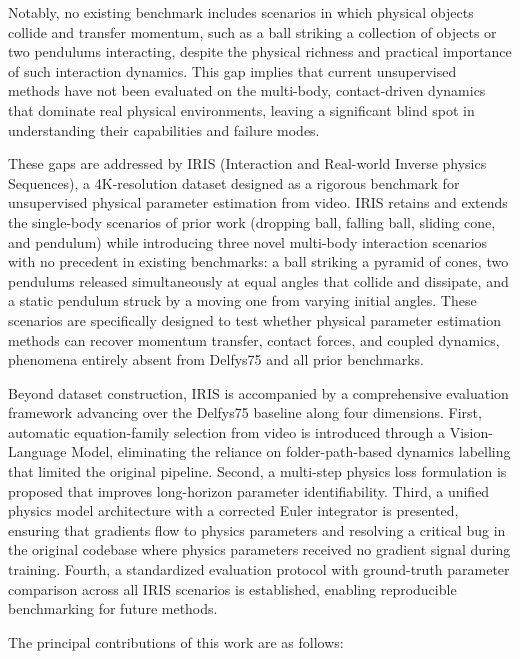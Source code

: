 \documentclass[runningheads]{llncs}
\begin{document}
Notably, no existing benchmark includes scenarios in which physical objects collide and transfer momentum, such as a ball striking a collection of objects or two pendulums interacting, despite the physical richness and practical importance of such interaction dynamics. This gap implies that current unsupervised methods have not been evaluated on the multi-body, contact-driven dynamics that dominate real physical environments, leaving a significant blind spot in understanding their capabilities and failure modes.

These gaps are addressed by IRIS (Interaction and Real-world Inverse physics Sequences), a 4K-resolution dataset designed as a rigorous benchmark for unsupervised physical parameter estimation from video. IRIS retains and extends the single-body scenarios of prior work (dropping ball, falling ball, sliding cone, and pendulum) while introducing three novel multi-body interaction scenarios with no precedent in existing benchmarks: a ball striking a pyramid of cones, two pendulums released simultaneously at equal angles that collide and dissipate, and a static pendulum struck by a moving one from varying initial angles. These scenarios are specifically designed to test whether physical parameter estimation methods can recover momentum transfer, contact forces, and coupled dynamics, phenomena entirely absent from Delfys75 and all prior benchmarks.

Beyond dataset construction, IRIS is accompanied by a comprehensive evaluation framework advancing over the Delfys75 baseline along four dimensions. First, automatic equation-family selection from video is introduced through a Vision-Language Model, eliminating the reliance on folder-path-based dynamics labelling that limited the original pipeline. Second, a multi-step physics loss formulation is proposed that improves long-horizon parameter identifiability. Third, a unified physics model architecture with a corrected Euler integrator is presented, ensuring that gradients flow to physics parameters and resolving a critical bug in the original codebase where physics parameters received no gradient signal during training. Fourth, a standardized evaluation protocol with ground-truth parameter comparison across all IRIS scenarios is established, enabling reproducible benchmarking for future methods.

The principal contributions of this work are as follows:
\end{document}
